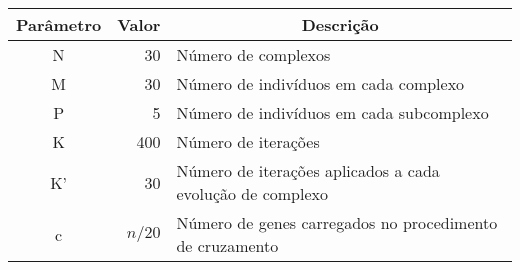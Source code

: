 \begin{tabular}{c|r|p{65mm}}
\hline
  Parâmetro
   & Valor
   & \multicolumn{1}{c}{Descrição} \\ \hline
  N  &  30    & Número de complexos \\ \hline
  M  &  30    & Número de indivíduos em cada complexo\\ \hline
  P  &   5    & Número de indivíduos em cada subcomplexo\\ \hline
  K  & 400    & Número de iterações\\ \hline
  K' &  30    & Número de iterações aplicados a cada evolução de complexo\\ \hline
  c  & $n/20$ & Número de genes carregados no procedimento de cruzamento\\ \hline
\end{tabular}
